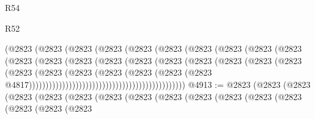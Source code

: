 \begin{lexlean}{R54}
\begin{lexlean}{R52}
\begin{coremodule}
{{{{{{{{{{{{{{{{{{{{{{{{{{{{{{{{{{{{{{{{{{{{{{{{{{{{{{{{{{{{{{{{{{{{{{{{{{{{{{{{{{{{{{{{{{{{{{{{{{{{{{{{{{{{{{{{{{{{{{{{{{{{{{{{{{{{{{{{{{{{{{{{{{{{{{{{{{{{{{{{{{{{{{{{{{{{{{{{{{{{{{{{{{{{{{{{{{{{{{                                            (@2823
                                              (@2823
                                                (@2823
                                                  (@2823
                                                    (@2823
                                                      (@2823
                                                        (@2823
                                                          (@2823
                                                            (@2823
                                                              (@2823
                                                                (@2823
                                                                  (@2823
                                                                    (@2823
                                                                      (@2823
                                                                        (@2823
                                                                          (@2823
                                                                            (@2823
                                                                              (@2823
                                                                                (@2823
                                                                                  (@2823
                                                                                    (@2823
                                                                                      (@2823
                                                                                        (@2823
                                                                                          (@2823
                                                                                            (@2823
                                                                                              (@2823
                                                                                                (@2823
                                                                                                  @4817)))))))))))))))))))))))))))))))))))))))))))))))
@4913 := @2823
    (@2823
      (@2823
        (@2823
          (@2823
            (@2823
              (@2823
                (@2823
                  (@2823
                    (@2823
                      (@2823
                        (@2823
                          (@2823
                            (@2823
                              (@2823
                                (@2823
}}}}}}}}}}}}}}}}}}}}}}}}}}}}}}}}}}}}}}}}}}}}}}}}}}}}}}}}}}}}}}}}}}}}}}}}}}}}}}}}}}}}}}}}}}}}}}}}}}}}}}}}}}}}}}}}}}}}}}}}}}}}}}}}}}}}}}}}}}}}}}}}}}}}}}}}}}}}}}}}}}}}}}}}}}}}}}}}}}}}}}}}}}}}}}}}}}}}}}
\end{coremodule}
\end{lexlean}
\end{lexlean}
